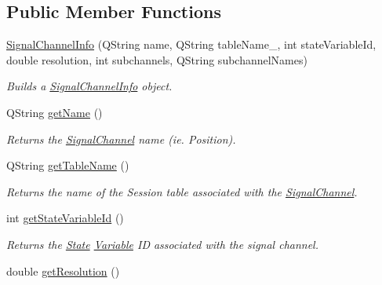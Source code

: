\subsection*{Public Member Functions}
\begin{DoxyCompactItemize}
\item 
\hyperlink{class_picto_1_1_signal_channel_info_abdb8dde746e09c8ebbeb4593259e210e}{Signal\-Channel\-Info} (Q\-String name, Q\-String table\-Name\-\_\-, int state\-Variable\-Id, double resolution, int subchannels, Q\-String subchannel\-Names)
\begin{DoxyCompactList}\small\item\em Builds a \hyperlink{class_picto_1_1_signal_channel_info}{Signal\-Channel\-Info} object. \end{DoxyCompactList}\item 
\hypertarget{class_picto_1_1_signal_channel_info_a29e9f31bb402992f3638e018d318f79e}{Q\-String \hyperlink{class_picto_1_1_signal_channel_info_a29e9f31bb402992f3638e018d318f79e}{get\-Name} ()}\label{class_picto_1_1_signal_channel_info_a29e9f31bb402992f3638e018d318f79e}

\begin{DoxyCompactList}\small\item\em Returns the \hyperlink{class_picto_1_1_signal_channel}{Signal\-Channel} name (ie. Position). \end{DoxyCompactList}\item 
\hypertarget{class_picto_1_1_signal_channel_info_a734b9ba8b4c3484139d5c230b6659e0a}{Q\-String \hyperlink{class_picto_1_1_signal_channel_info_a734b9ba8b4c3484139d5c230b6659e0a}{get\-Table\-Name} ()}\label{class_picto_1_1_signal_channel_info_a734b9ba8b4c3484139d5c230b6659e0a}

\begin{DoxyCompactList}\small\item\em Returns the name of the Session table associated with the \hyperlink{class_picto_1_1_signal_channel}{Signal\-Channel}. \end{DoxyCompactList}\item 
\hypertarget{class_picto_1_1_signal_channel_info_a7e1d2cfe9f87809e7d277f54f9cbea8c}{int \hyperlink{class_picto_1_1_signal_channel_info_a7e1d2cfe9f87809e7d277f54f9cbea8c}{get\-State\-Variable\-Id} ()}\label{class_picto_1_1_signal_channel_info_a7e1d2cfe9f87809e7d277f54f9cbea8c}

\begin{DoxyCompactList}\small\item\em Returns the \hyperlink{class_picto_1_1_state}{State} \hyperlink{class_picto_1_1_variable}{Variable} I\-D associated with the signal channel. \end{DoxyCompactList}\item 
\hypertarget{class_picto_1_1_signal_channel_info_a98b2349de1910dfe285af114f78b774c}{double \hyperlink{class_picto_1_1_signal_channel_info_a98b2349de1910dfe285af114f78b774c}{get\-Resolution} ()}\label{class_picto_1_1_signal_channel_info_a98b2349de1910dfe285af114f78b774c}


\end{DoxyCompactItemize}
